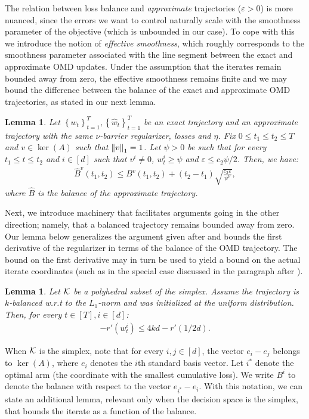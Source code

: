 \documentclass[10pt]{article}
\newtheorem{lemma}[theorem]{Lemma}
\theoremstyle{definition}
\theoremstyle{remark}
\renewcommand{\epsilon}{\varepsilon}
\newcommand{\curly}[1]{ {\left\{ #1 \right\}}}
\newcommand{\barconst}{\nu}
\begin{document}
The relation between loss balance and \emph{approximate} trajectories ($\epsilon>0$) is more nuanced, since the errors we want to control naturally scale with the smoothness parameter of the objective (which is unbounded in our case).
To cope with this we introduce the notion of \emph{effective smoothness}, which roughly corresponds to the smoothness parameter associated with the line segment between the exact and approximate OMD updates.
Under the assumption that the iterates remain bounded away from zero, the effective smoothness remains finite and we may bound the 
difference between the balance of the exact and approximate OMD trajectories, as stated in our next lemma.
\begin{lemma}\label{lem:trajectory diff}
Let $\curly{w_t}_{t=1}^T,\curly{\hat{w}_t}_{t=1}^T$ be an exact trajectory and an approximate trajectory with the same $\barconst$-barrier regularizer, losses and $\eta$. Fix $0\le t_1\le t_2\le T$ and $v\in \ker(A)$ such that $\norm{v}_1 = 1$. Let $\psi>0$ be such that for every $t_1\le t\le t_2$ and $i\in[d]$ such that $v^i\ne 0$, $w_t^i\ge \psi$ and $\epsilon \le c_2\psi/2$. Then, we have:
\begin{align*}
    \hat{B}^v(t_1,t_2) \le B^v(t_1,t_2) + (t_2-t_1)\sqrt{\frac{c_2\epsilon}{\psi^\barconst}},
\end{align*}
where $\hat{B}$ is the balance of the approximate trajectory.
\end{lemma}
Next, we introduce machinery that facilitates arguments going in the other direction; namely, that a balanced trajectory remains bounded away from zero.
Our lemma below generalizes the argument given after  and bounds the first derivative of the regularizer in terms of the balance of the OMD trajectory. The bound on the first derivative may in turn be used to yield a bound on the actual iterate coordinates (such as in the special case discussed in the paragraph after ).
\begin{lemma}\label{lem:balance to gradient UB}
Let $\mathcal K$ be a polyhedral subset of the simplex. Assume the trajectory is $k$-balanced w.r.t to the $L_1$-norm and was initialized at the uniform distribution. Then, for every $t\in[T],i\in[d]$:
\begin{align*}
    -r'(w_t^i)
    \leq 
    4kd - r'(1/2d)
    .
\end{align*}
\end{lemma}

When $\mathcal K$ is the simplex, note that for every $i,j \in [d]$, the vector $e_i - e_j$ belongs to $\ker(A)$, where $e_i$ denotes the $i$th standard basis vector. 
Let $i^*$ denote the optimal arm (the coordinate with the smallest cumulative loss). 
We write $B^i$ to denote the balance with respect to the vector $e_{i^*} - e_i$. 
With this notation, we can state an additional lemma, relevant only when the decision space is the simplex, that bounds the iterate as a function of the balance.
\end{document}
